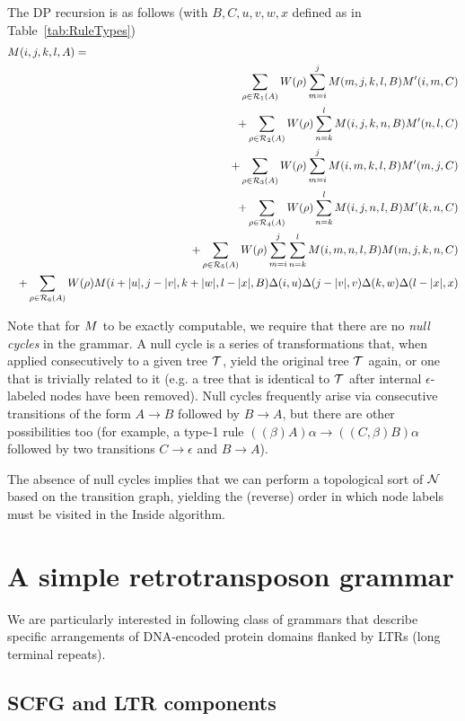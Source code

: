 \documentclass[10pt]{article}
\newcommand{\seclabel}[1]{\label{sec:#1}}
\newcommand{\tabnum}[1]{\ref{tab:#1}}
\newcommand{\tabref}[1]{Table~\tabnum{#1}}
\begin{document}
The DP recursion is as follows (with $B,C,u,v,w,x$ defined as in \tabref{RuleTypes})
\begin{eqnarray*}
\lefteqn{\m(i,j,k,l,A) =} \\
& &
\sum_{\rho \in \rulesubset{1}{A}} W(\rho) \sum_{m=i}^j \m(m,j,k,l,B) \mtip(i,m,C) \\
& & +
\sum_{\rho \in \rulesubset{2}{A}} W(\rho) \sum_{n=k}^l \m(i,j,k,n,B) \mtip(n,l,C) \\
& & +
\sum_{\rho \in \rulesubset{3}{A}} W(\rho) \sum_{m=i}^j \m(i,m,k,l,B) \mtip(m,j,C) \\
& & +
\sum_{\rho \in \rulesubset{4}{A}} W(\rho) \sum_{n=k}^l \m(i,j,n,l,B) \mtip(k,n,C) \\
& & +
\sum_{\rho \in \rulesubset{5}{A}} W(\rho) \sum_{m=i}^j \sum_{n=k}^l \m(i,m,n,l,B) \m(m,j,k,n,C) \\
& & +
\sum_{\rho \in \rulesubset{6}{A}} W(\rho) \m(i+|u|,j-|v|,k+|w|,l-|x|,B)
 \Delta(i,u) \Delta(j-|v|,v) \Delta(k,w) \Delta(l-|x|,x)
\end{eqnarray*}

Note that for $M$ to be exactly computable, we require that there are no {\em null cycles} in the grammar.
A null cycle is a series of transformations that, when applied consecutively to a given tree ${\cal T}$, yield the original tree ${\cal T}$ again,
or one that is trivially related to it (e.g. a tree that is identical to ${\cal T}$ after internal $\epsilon$-labeled nodes have been removed).
Null cycles frequently arise via consecutive transitions of the form $A \to B$ followed by $B \to A$,
but there are other possibilities too (for example, a type-1 rule $((\beta)A)\alpha \to ((C,\beta)B)\alpha$
followed by two transitions $C \to \epsilon$ and $B \to A$).

The absence of null cycles implies that we can perform a topological sort of ${\cal N}$ based on the transition graph,
yielding the (reverse) order in which node labels must be visited in the Inside algorithm.


\section{A simple retrotransposon grammar}
\seclabel{RetroGrammar}

We are particularly interested in following class of grammars that describe specific arrangements of DNA-encoded protein domains flanked by LTRs (long terminal repeats).

\subsection{SCFG and LTR components}
\end{document}
